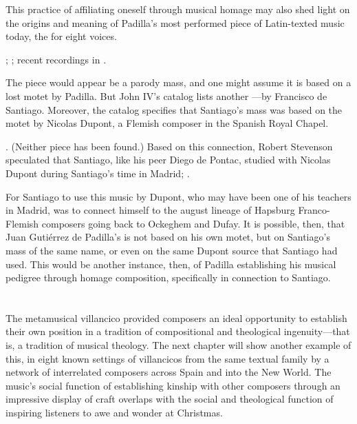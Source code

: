This practice of affiliating oneself through musical homage may also shed light
on the origins and meaning of Padilla's most performed piece of Latin-texted
music today, the  for eight voices.%
\begin{Footnote}
    ; \autocite{Padilla:MissaEgoFlosCampi}; recent
    recordings in \autocites{Mauleon:PadillaPalafox}{Skidmore:NewWorldCD}.
\end{Footnote}
The piece would appear be a parody mass, and one might assume it is based on a
lost motet  by Padilla.
But John IV's catalog lists another ---by Francisco de Santiago.
Moreover, the catalog specifies that Santiago's mass was based on the motet
 by Nicolas Dupont, a Flemish composer in the Spanish
Royal Chapel.%
\begin{Footnote}
    \Autocites
    [417, caixão 34, : ] {JohnIV:Catalog}
    [381, caixão 32, : .]
    {JohnIV:Catalog}.
    (Neither piece has been found.)
    Based on this connection, Robert Stevenson speculated that Santiago, like his
    peer Diego de Pontac, studied with Nicolas Dupont during Santiago's time in
    Madrid; \autocite{Stevenson:SantiagoF}.
\end{Footnote}
For Santiago to use this music by Dupont, who may have been one of his teachers
in Madrid, was to connect himself to the august lineage of Hapsburg
Franco-Flemish composers going back to Ockeghem and Dufay.
It is possible, then, that Juan Gutiérrez de Padilla's  is not based on his own motet, but on Santiago's mass of the same
name, or even on the same Dupont source that Santiago had used.
This would be another instance, then, of Padilla establishing his musical
pedigree through homage composition, specifically in connection to Santiago.

\section{}

The metamusical villancico provided composers an ideal opportunity to establish
their own position in a tradition of compositional and theological
ingenuity---that is, a tradition of musical theology.
The next chapter will show another example of this, in eight known settings of
villancicos from the same textual family by a network of interrelated composers
across Spain and into the New World.
The music's social function of establishing kinship with other composers through
an impressive display of craft overlaps with the social and theological function
of inspiring listeners to awe and wonder at Christmas.

